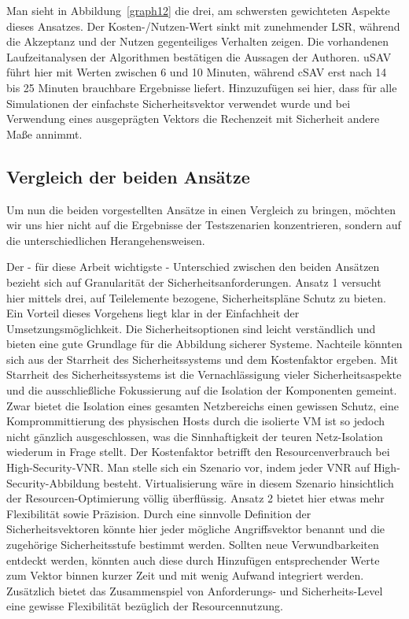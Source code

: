 \documentclass{lni}
\begin{document}
Man sieht in Abbildung~\ref{graph12} die drei, am schwersten gewichteten Aspekte dieses Ansatzes. Der Kosten-/Nutzen-Wert sinkt mit zunehmender LSR, während die Akzeptanz und der Nutzen gegenteiliges Verhalten zeigen. Die vorhandenen Laufzeitanalysen der Algorithmen bestätigen die Aussagen der Authoren. uSAV führt hier mit Werten zwischen 6 und 10 Minuten, während cSAV erst nach 14 bis 25 Minuten brauchbare Ergebnisse liefert. Hinzuzufügen sei hier, dass für alle Simulationen der einfachste Sicherheitsvektor verwendet wurde und bei Verwendung eines ausgeprägten Vektors die Rechenzeit mit Sicherheit andere Maße annimmt.


\subsection{Vergleich der beiden Ansätze}
\label{subsec:svne_vergleich}

Um nun die beiden vorgestellten Ansätze in einen Vergleich zu bringen, möchten wir uns hier nicht auf die Ergebnisse der Testszenarien konzentrieren, sondern auf die unterschiedlichen Herangehensweisen.

Der - für diese Arbeit wichtigste - Unterschied zwischen den beiden Ansätzen bezieht sich auf Granularität der Sicherheitsanforderungen. Ansatz 1 versucht hier mittels drei, auf Teilelemente bezogene, Sicherheitspläne Schutz zu bieten. Ein Vorteil dieses Vorgehens liegt klar in der Einfachheit der Umsetzungsmöglichkeit. Die Sicherheitsoptionen sind leicht verständlich und bieten eine gute Grundlage für die Abbildung sicherer Systeme. Nachteile könnten sich aus der Starrheit des Sicherheitssystems und dem Kostenfaktor ergeben. Mit Starrheit des Sicherheitssystems ist die Vernachlässigung vieler Sicherheitsaspekte und die ausschließliche Fokussierung auf die Isolation der Komponenten gemeint. Zwar bietet die Isolation eines gesamten Netzbereichs einen gewissen Schutz, eine Komprommittierung des physischen Hosts durch die isolierte VM ist so jedoch nicht gänzlich ausgeschlossen, was die Sinnhaftigkeit der teuren Netz-Isolation wiederum in Frage stellt. Der Kostenfaktor betrifft den Resourcenverbrauch bei High-Security-VNR. Man stelle sich ein Szenario vor, indem jeder VNR auf High-Security-Abbildung besteht. Virtualisierung wäre in diesem Szenario hinsichtlich der Resourcen-Optimierung völlig überflüssig. Ansatz 2 bietet hier etwas mehr Flexibilität sowie Präzision. Durch eine sinnvolle Definition der Sicherheitsvektoren könnte hier jeder mögliche Angriffsvektor benannt und die zugehörige Sicherheitsstufe bestimmt werden. Sollten neue Verwundbarkeiten entdeckt werden, könnten auch diese durch Hinzufügen entsprechender Werte zum Vektor binnen kurzer Zeit und mit wenig Aufwand integriert werden. Zusätzlich bietet das Zusammenspiel von Anforderungs- und Sicherheits-Level eine gewisse Flexibilität bezüglich der Resourcennutzung. 
\end{document}
